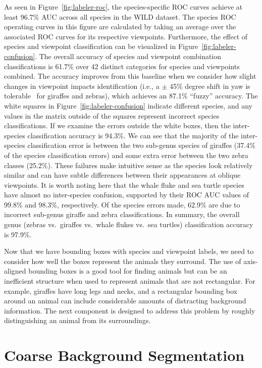 As seen in Figure~\ref{fig:labeler-roc}, the species-specific ROC curves achieve at least 96.7\% AUC across all species in the WILD dataset.  The species ROC operating curves in this figure are calculated by taking an average over the associated ROC curves for its respective viewpoints.  Furthermore, the effect of species and viewpoint classification can be visualized in Figure~\ref{fig:labeler-confusion}.  The overall accuracy of species and viewpoint combination classifications is 61.7\% over 42 distinct categories for species and viewpoints combined.  The accuracy improves from this baseline when we consider how slight changes in viewpoint impacts identification (i.e., a $\pm$ 45\% degree shift in yaw is tolerable~\cite{crall_hotspotter_2013} for giraffes and zebras), which achieves an 87.1\% ``fuzzy'' accuracy.  The white squares in Figure~\ref{fig:labeler-confusion} indicate different species, and any values in the matrix outside of the squares represent incorrect species classifications.  If we examine the errors outside the white boxes, then the inter-species classification accuracy is 94.3\%.  We can see that the majority of the inter-species classification error is between the two sub-genus species of giraffes (37.4\% of the species classification errors) and some extra error between the two zebra classes (25.2\%).  These failures make intuitive sense as the species look relatively similar and can have subtle differences between their appearances at oblique viewpoints.  It is worth noting here that the whale fluke and sea turtle species have almost no inter-species confusion, supported by their ROC AUC values of 99.8\% and 98.3\%, respectively.  Of the species errors made, 62.9\% are due to incorrect sub-genus giraffe and zebra classifications.  In summary, the overall genus (zebras vs.\ giraffes vs.\ whale flukes vs.\ sea turtles) classification accuracy is 97.9\%.

Now that we have bounding boxes with species and viewpoint labels, we need to consider how well the boxes represent the animals they surround.  The use of axis-aligned bounding boxes is a good tool for finding animals but can be an inefficient structure when used to represent animals that are not rectangular.  For example, giraffes have long legs and necks, and a rectangular bounding box around an animal can include considerable amounts of distracting background information.  The next component is designed to address this problem by roughly distinguishing an animal from its surroundings.

\section{Coarse Background Segmentation} \label{sec:background}

